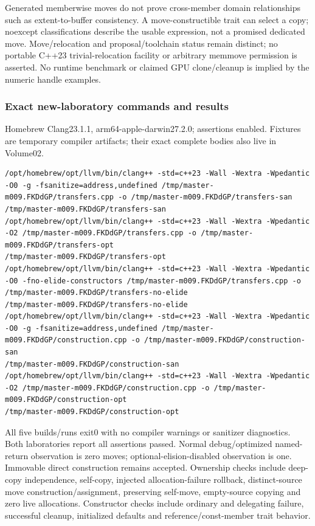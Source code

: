 Generated memberwise moves do not prove cross-member domain relationships such as extent-to-buffer consistency. A move-constructible trait can select a copy; noexcept classifications describe the usable expression, not a promised dedicated move. Move/relocation and proposal/toolchain status remain distinct; no portable C++23 trivial-relocation facility or arbitrary memmove permission is asserted. No runtime benchmark or claimed GPU clone/cleanup is implied by the numeric handle examples.

\subsubsection{Exact new-laboratory commands and results}\label{appendix-a103e7846d21-exact-new-laboratory-commands-and-results}

\hypertarget{appendix-a103e7846d21-exact-new-laboratory-commands-and-results}{}

Homebrew Clang23.1.1, arm64-apple-darwin27.2.0; assertions enabled. Fixtures are temporary compiler artifacts; their exact complete bodies also live in Volume02.

\begin{verbatim}
/opt/homebrew/opt/llvm/bin/clang++ -std=c++23 -Wall -Wextra -Wpedantic -O0 -g -fsanitize=address,undefined /tmp/master-m009.FKDdGP/transfers.cpp -o /tmp/master-m009.FKDdGP/transfers-san
/tmp/master-m009.FKDdGP/transfers-san
/opt/homebrew/opt/llvm/bin/clang++ -std=c++23 -Wall -Wextra -Wpedantic -O2 /tmp/master-m009.FKDdGP/transfers.cpp -o /tmp/master-m009.FKDdGP/transfers-opt
/tmp/master-m009.FKDdGP/transfers-opt
/opt/homebrew/opt/llvm/bin/clang++ -std=c++23 -Wall -Wextra -Wpedantic -O0 -fno-elide-constructors /tmp/master-m009.FKDdGP/transfers.cpp -o /tmp/master-m009.FKDdGP/transfers-no-elide
/tmp/master-m009.FKDdGP/transfers-no-elide
/opt/homebrew/opt/llvm/bin/clang++ -std=c++23 -Wall -Wextra -Wpedantic -O0 -g -fsanitize=address,undefined /tmp/master-m009.FKDdGP/construction.cpp -o /tmp/master-m009.FKDdGP/construction-san
/tmp/master-m009.FKDdGP/construction-san
/opt/homebrew/opt/llvm/bin/clang++ -std=c++23 -Wall -Wextra -Wpedantic -O2 /tmp/master-m009.FKDdGP/construction.cpp -o /tmp/master-m009.FKDdGP/construction-opt
/tmp/master-m009.FKDdGP/construction-opt
\end{verbatim}

All five builds/runs exit0 with no compiler warnings or sanitizer diagnostics. Both laboratories report all assertions passed. Normal debug/optimized named-return observation is zero moves; optional-elision-disabled observation is one. Immovable direct construction remains accepted. Ownership checks include deep-copy independence, self-copy, injected allocation-failure rollback, distinct-source move construction/assignment, preserving self-move, empty-source copying and zero live allocations. Constructor checks include ordinary and delegating failure, successful cleanup, initialized defaults and reference/const-member trait behavior.

